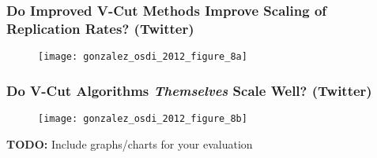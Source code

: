 \begin{frame}
  \frametitle{\small{Do Improved V-Cut Methods Improve Scaling of Replication
              Rates? (Twitter)}}
  \centering
  \begin{figure}
    \texttt{[image: gonzalez\_osdi\_2012\_figure\_8a]}
    \caption{\cite[OSDI '12]{gonzalez2012powergraph}}
  \end{figure}
\end{frame}

\begin{frame}
  \frametitle{\small{Do V-Cut Algorithms \textit{Themselves} Scale Well?
              (Twitter)}}
  \centering
  \begin{figure}
    \texttt{[image: gonzalez\_osdi\_2012\_figure\_8b]}
    \caption{\cite[OSDI '12]{gonzalez2012powergraph}}
  \end{figure}
\end{frame}

\begin{frame}
  \textbf{TODO:} Include graphs/charts for your evaluation
\end{frame}
